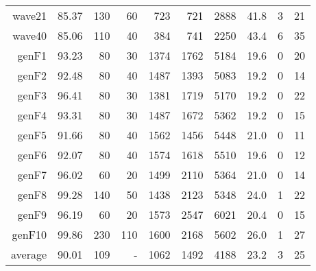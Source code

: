 \begin{table}
\begin{tabular}{|r|r|r|r|r|r|r|r|r|r|}
{\sc wave21} & 85.37 & 130 & 60 & 723 & 721 & 2888 & 41.8 & 3 & 21 \\
{\sc wave40} & 85.06 & 110 & 40 & 384 & 741 & 2250 & 43.4 & 6 & 35 \\
{\sc genF1} & 93.23 & 80 & 30 & 1374 & 1762 & 5184 & 19.6 & 0 & 20 \\
{\sc genF2} & 92.48 & 80 & 40 & 1487 & 1393 & 5083 & 19.2 & 0 & 14 \\
{\sc genF3} & 96.41 & 80 & 30 & 1381 & 1719 & 5170 & 19.2 & 0 & 22 \\
{\sc genF4} & 93.31 & 80 & 30 & 1487 & 1672 & 5362 & 19.2 & 0 & 15 \\
{\sc genF5} & 91.66 & 80 & 40 & 1562 & 1456 & 5448 & 21.0 & 0 & 11 \\
{\sc genF6} & 92.07 & 80 & 40 & 1574 & 1618 & 5510 & 19.6 & 0 & 12 \\
{\sc genF7} & 96.02 & 60 & 20 & 1499 & 2110 & 5364 & 21.0 & 0 & 14 \\
{\sc genF8} & 99.28 & 140 & 50 & 1438 & 2123 & 5348 & 24.0 & 1 & 22 \\
{\sc genF9} & 96.19 & 60 & 20 & 1573 & 2547 & 6021 & 20.4 & 0 & 15 \\
{\sc genF10} & 99.86 & 230 & 110 & 1600 & 2168 & 5602 & 26.0 & 1 & 27 \\
\hline
average & 90.01 & 109 &  -  & 1062 & 1492 & 4188 & 23.2 & 3 & 25 \\
\hline
\end{tabular}
\end{table}
\clearpage
